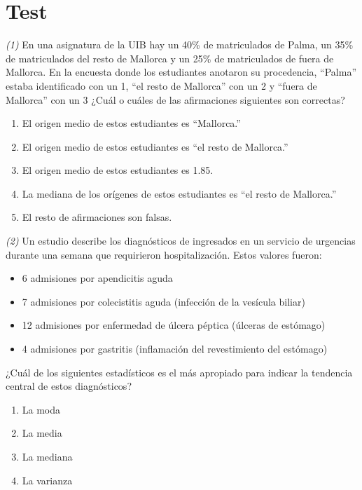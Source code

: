 \documentclass[
]{book}
\providecommand{\tightlist}{%
  \setlength{\itemsep}{0pt}\setlength{\parskip}{0pt}}
\theoremstyle{definition}
\theoremstyle{definition}
\theoremstyle{definition}
\theoremstyle{definition}
\theoremstyle{remark}
\begin{document}
\hypertarget{test-7}{%
\section{Test}\label{test-7}}

\emph{(1)} En una asignatura de la UIB hay un 40\% de matriculados de Palma, un 35\% de matriculados del resto de Mallorca y un 25\% de matriculados de fuera de Mallorca. En la encuesta donde los estudiantes anotaron su procedencia, ``Palma'' estaba identificado con un 1, ``el resto de Mallorca'' con un 2 y ``fuera de Mallorca'' con un 3 ¿Cuál o cuáles de las afirmaciones siguientes son correctas?

\begin{enumerate}
\def\labelenumi{\arabic{enumi}.}
\tightlist
\item
  El origen medio de estos estudiantes es ``Mallorca.''
\item
  El origen medio de estos estudiantes es ``el resto de Mallorca.''
\item
  El origen medio de estos estudiantes es 1.85.
\item
  La mediana de los orígenes de estos estudiantes es ``el resto de Mallorca.''
\item
  El resto de afirmaciones son falsas.
\end{enumerate}

\emph{(2)} Un estudio describe los diagnósticos de ingresados en un servicio de urgencias durante una semana que requirieron hospitalización. Estos valores fueron:

\begin{itemize}
\tightlist
\item
  6 admisiones por apendicitis aguda
\item
  7 admisiones por colecistitis aguda (infección de la vesícula biliar)
\item
  12 admisiones por enfermedad de úlcera péptica (úlceras de estómago)
\item
  4 admisiones por gastritis (inflamación del revestimiento del estómago)
\end{itemize}

¿Cuál de los siguientes estadísticos es el más apropiado para indicar la tendencia central de estos diagnósticos?

\begin{enumerate}
\def\labelenumi{\arabic{enumi}.}
\tightlist
\item
  La moda
\item
  La media
\item
  La mediana
\item
  La varianza
\end{enumerate}
\end{document}
